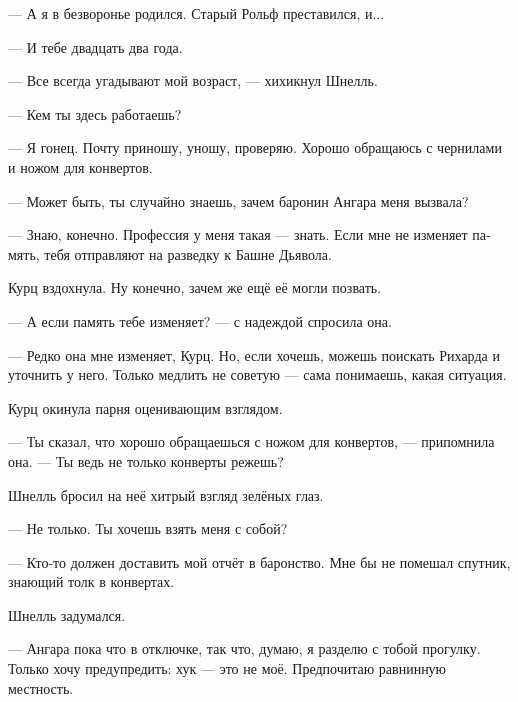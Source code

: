 \documentclass[a4paper,10pt,fleqn]{book}\usepackage{polyglossia}\setdefaultlanguage[babelshorthands=true]{russian}\setotherlanguage{english}\defaultfontfeatures{Ligatures=TeX,Mapping=tex-text}\usepackage{xcolor}\newcommand{\ml}[3]{#2}
\begin{document}
--- А я в безворонье родился.
Старый Рольф преставился, и...

--- И тебе двадцать два года.

--- Все всегда угадывают мой возраст, --- хихикнул Шнелль.

--- Кем ты здесь работаешь?

--- Я гонец.
Почту приношу, уношу, проверяю.
Хорошо обращаюсь с чернилами и ножом для конвертов.

\ml{$0$}
{--- Может быть, ты случайно знаешь, зачем баронин Ангара меня вызвала?}
{``Maybe you know by chance, why Baronin Angara paged me?''}

\ml{$0$}
{--- Знаю, конечно.}
{``Of course I know.}
\ml{$0$}
{Профессия у меня такая --- знать.}
{That's my job, to know.}
\ml{$0$}
{Если мне не изменяет память, тебя отправляют на разведку к Башне Дьявола.}
{If I recall correctly, you're ordered to scout the Devil Tower.''}

Курц вздохнула.
Ну конечно, зачем же ещё её могли позвать.

\ml{$0$}
{--- А если память тебе изменяет? --- с надеждой спросила она.}
{``Is there any chance you recall incorrectly?'' she asked with hope.}

\ml{$0$}
{--- Редко она мне изменяет, Курц.}
{``That happens very rarely, Kurz.}
\ml{$0$}
{Но, если хочешь, можешь поискать Рихарда и уточнить у него.}
{But, if you insist, you can look for Richard and clear it with him.}
Только медлить не советую --- сама понимаешь, какая ситуация.

Курц окинула парня оценивающим взглядом.

--- Ты сказал, что хорошо обращаешься с ножом для конвертов, --- припомнила она.
\ml{$0$}
{--- Ты ведь не только конверты режешь?}
{``Your knife is good not only for envelopes, isn't it?''}

Шнелль бросил на неё хитрый взгляд зелёных глаз.

\ml{$0$}
{--- Не только.}
{``Not only.}
\ml{$0$}
{Ты хочешь взять меня с собой?}
{Do you want me to go with you?''}

--- Кто-то должен доставить мой отчёт в баронство.
\ml{$0$}
{Мне бы не помешал спутник, знающий толк в конвертах.}
{I could use a companion who knows envelopes.''}

Шнелль задумался.

--- Ангара пока что в отключке, так что, думаю, я разделю с тобой прогулку.
\ml{$0$}
{Только хочу предупредить: хук --- это не моё.}
{Just a fair warning: hook is not my piece of pie.}
\ml{$0$}
{Предпочитаю равнинную местность.}
{I prefer flat terrain.''}
\end{document}
